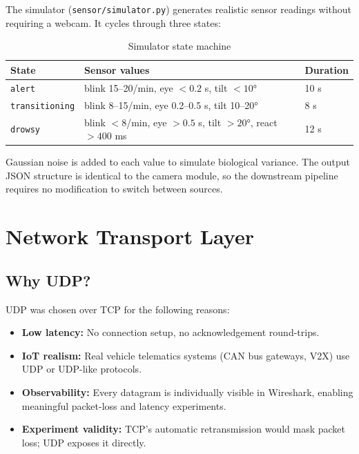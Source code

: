 \documentclass[12pt, a4paper]{article}
\begin{document}
The simulator (\texttt{sensor/simulator.py}) generates realistic sensor readings
without requiring a webcam. It cycles through three states:

\begin{table}[H]
\centering
\caption{Simulator state machine}
\begin{tabularx}{\textwidth}{lXl}
\toprule
\textbf{State} & \textbf{Sensor values} & \textbf{Duration} \\
\midrule
\texttt{alert}         & blink 15--20/min, eye $<0.2$ s, tilt $<10°$ & 10 s \\
\texttt{transitioning} & blink 8--15/min, eye 0.2--0.5 s, tilt 10--20° & 8 s \\
\texttt{drowsy}        & blink $<8$/min, eye $>0.5$ s, tilt $>20°$, react $>400$ ms & 12 s \\
\bottomrule
\end{tabularx}
\end{table}

Gaussian noise is added to each value to simulate biological variance. The output
JSON structure is identical to the camera module, so the downstream pipeline
requires no modification to switch between sources.

\section{Network Transport Layer}
\label{sec:network}

\subsection{Why UDP?}

UDP was chosen over TCP for the following reasons:

\begin{itemize}
    \item \textbf{Low latency:} No connection setup, no acknowledgement round-trips.
    \item \textbf{IoT realism:} Real vehicle telematics systems (CAN bus gateways,
          V2X) use UDP or UDP-like protocols.
    \item \textbf{Observability:} Every datagram is individually visible in Wireshark,
          enabling meaningful packet-loss and latency experiments.
    \item \textbf{Experiment validity:} TCP's automatic retransmission would mask
          packet loss; UDP exposes it directly.
\end{itemize}
\end{document}
